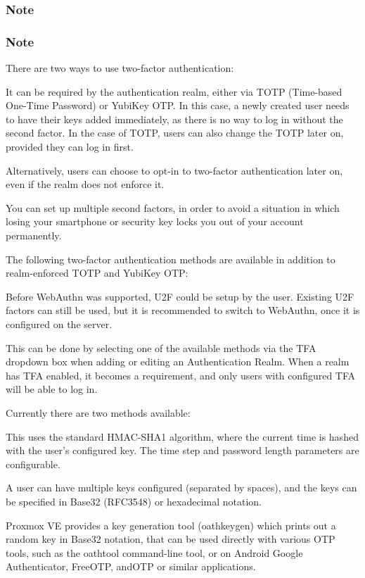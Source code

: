 \subsubsection{Note}

\subsubsection{Note}

There are two ways to use two-factor authentication:

It can be required by the authentication realm, either via TOTP (Time-based One-Time Password) or YubiKey OTP. In this case, a newly created user needs to have their keys added immediately, as there is no way to log in without the second factor. In the case of TOTP, users can also change the TOTP later on, provided they can log in first.

Alternatively, users can choose to opt-in to two-factor authentication later on, even if the realm does not enforce it.

You can set up multiple second factors, in order to avoid a situation in which losing your smartphone or security key locks you out of your account permanently.

The following two-factor authentication methods are available in addition to realm-enforced TOTP and YubiKey OTP:

Before WebAuthn was supported, U2F could be setup by the user. Existing U2F factors can still be used, but it is recommended to switch to WebAuthn, once it is configured on the server.

This can be done by selecting one of the available methods via the TFA dropdown box when adding or editing an Authentication Realm. When a realm has TFA enabled, it becomes a requirement, and only users with configured TFA will be able to log in.

Currently there are two methods available:

This uses the standard HMAC-SHA1 algorithm, where the current time is hashed with the user’s configured key. The time step and password length parameters are configurable.

A user can have multiple keys configured (separated by spaces), and the keys can be specified in Base32 (RFC3548) or hexadecimal notation.

Proxmox VE provides a key generation tool (oathkeygen) which prints out a random key in Base32 notation, that can be used directly with various OTP tools, such as the oathtool command-line tool, or on Android Google Authenticator, FreeOTP, andOTP or similar applications.

